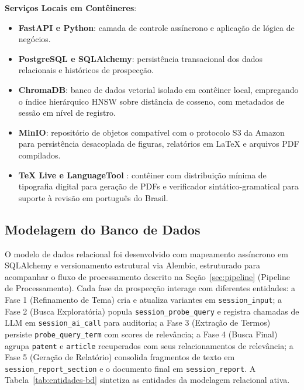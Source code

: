 \documentclass[12pt, a4paper]{article}
\begin{document}
  \textbf{Serviços Locais em Contêineres}:
  \begin{itemize}
    \item \textbf{FastAPI e Python}: camada de controle assíncrono e aplicação de lógica de negócios.
    \item \textbf{PostgreSQL e SQLAlchemy}: persistência transacional dos dados relacionais e históricos de prospecção.
    \item \textbf{ChromaDB}: banco de dados vetorial isolado em contêiner local, empregando o índice hierárquico HNSW sobre distância de cosseno, com metadados de sessão em nível de registro.
    \item \textbf{MinIO}: repositório de objetos compatível com o protocolo S3 da Amazon para persistência desacoplada de figuras, relatórios em LaTeX e arquivos PDF compilados.
    \item \textbf{TeX Live e LanguageTool} \cite{naber2003}: contêiner com distribuição mínima de tipografia digital para geração de PDFs e verificador sintático-gramatical para suporte à revisão em português do Brasil.
  \end{itemize}

  \subsection{Modelagem do Banco de Dados}
  \label{sec:modelagem-bd}

  O modelo de dados relacional foi desenvolvido com mapeamento assíncrono em SQLAlchemy e versionamento estrutural via Alembic, estruturado para acompanhar o fluxo de processamento descrito na Seção~\ref{sec:pipeline} (Pipeline de Processamento). Cada fase da prospecção interage com diferentes entidades: a Fase 1 (Refinamento de Tema) cria e atualiza variantes em \texttt{session\_input}; a Fase 2 (Busca Exploratória) popula \texttt{session\_probe\_query} e registra chamadas de LLM em \texttt{session\_ai\_call} para auditoria; a Fase 3 (Extração de Termos) persiste \texttt{probe\_query\_term} com scores de relevância; a Fase 4 (Busca Final) agrupa \texttt{patent} e \texttt{article} recuperados com seus relacionamentos de relevância; a Fase 5 (Geração de Relatório) consolida fragmentos de texto em \texttt{session\_report\_section} e o documento final em \texttt{session\_report}. A Tabela~\ref{tab:entidades-bd} sintetiza as entidades da modelagem relacional ativa.
\end{document}
